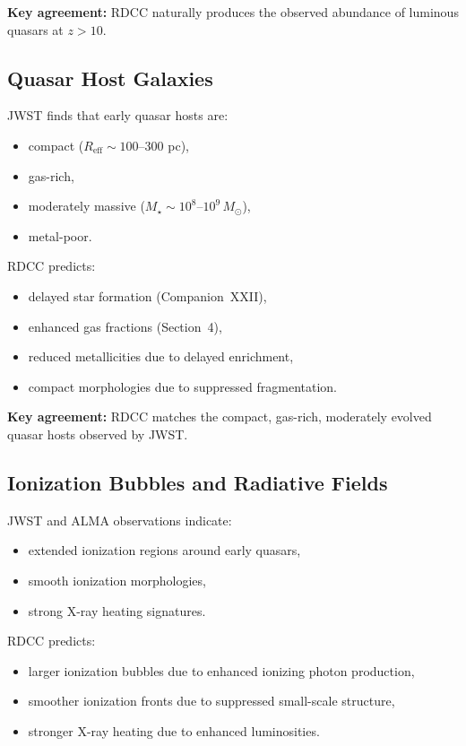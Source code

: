 \documentclass[11pt,a4paper]{article}
\begin{document}
\textbf{Key agreement:}  
RDCC naturally produces the observed abundance of luminous quasars at $z > 10$.

\subsection{Quasar Host Galaxies}

JWST finds that early quasar hosts are:
\begin{itemize}
\item compact ($R_{\mathrm{eff}} \sim 100$–$300$ pc),
\item gas-rich,
\item moderately massive ($M_{\star} \sim 10^{8}$–$10^{9}\,M_{\odot}$),
\item metal-poor.
\end{itemize}

RDCC predicts:
\begin{itemize}
\item delayed star formation (Companion~XXII),
\item enhanced gas fractions (Section~4),
\item reduced metallicities due to delayed enrichment,
\item compact morphologies due to suppressed fragmentation.
\end{itemize}

\textbf{Key agreement:}  
RDCC matches the compact, gas-rich, moderately evolved quasar hosts observed by JWST.

\subsection{Ionization Bubbles and Radiative Fields}

JWST and ALMA observations indicate:
\begin{itemize}
\item extended ionization regions around early quasars,
\item smooth ionization morphologies,
\item strong X-ray heating signatures.
\end{itemize}

RDCC predicts:
\begin{itemize}
\item larger ionization bubbles due to enhanced ionizing photon production,
\item smoother ionization fronts due to suppressed small-scale structure,
\item stronger X-ray heating due to enhanced luminosities.
\end{itemize}
\end{document}
